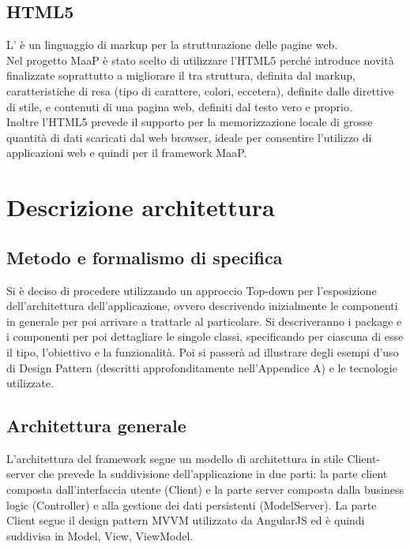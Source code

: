 \subsection{HTML5}
L' è un linguaggio di markup per la strutturazione delle pagine web.\\
Nel progetto MaaP è stato scelto di utilizzare l'HTML5 perché introduce novità finalizzate soprattutto a migliorare il  tra struttura, definita dal markup, caratteristiche di resa (tipo di carattere, colori, eccetera), definite dalle direttive di stile, e contenuti di una pagina web, definiti dal testo vero e proprio.\\
Inoltre l'HTML5 prevede il supporto per la memorizzazione locale di grosse quantità di dati scaricati dal web browser, ideale per consentire l'utilizzo di applicazioni web e quindi per il framework MaaP.

\newpage
\section{Descrizione architettura}
\subsection{Metodo e formalismo di specifica}
Si è deciso di procedere utilizzando un approccio Top-down per l'esposizione dell'architettura dell'applicazione, ovvero descrivendo inizialmente le componenti in generale per poi arrivare a trattarle al particolare.
Si descriveranno i package e i componenti per poi dettagliare le singole classi, specificando per ciascuna di esse il tipo, l'obiettivo e la funzionalità. Poi si passerà ad illustrare degli esempi d'uso di Design Pattern (descritti approfonditamente nell'Appendice A) e le tecnologie utilizzate.


\subsection{Architettura generale}
L'architettura del framework segue un modello di architettura in stile Client-server che prevede la suddivisione dell'applicazione  in due parti: la parte client composta dall'interfaccia utente (Client) e la parte server composta dalla business logic (Controller) e alla gestione dei dati persistenti (ModelServer). La parte Client segue il design pattern MVVM utilizzato da AngularJS ed è quindi suddivisa in Model, View, ViewModel.\\

